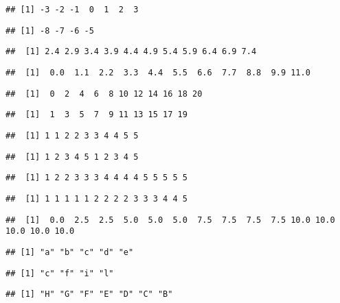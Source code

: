 \documentclass[
]{article}
\begin{document}
\begin{verbatim}
## [1] -3 -2 -1  0  1  2  3
\end{verbatim}

\begin{verbatim}
## [1] -8 -7 -6 -5
\end{verbatim}

\begin{verbatim}
##  [1] 2.4 2.9 3.4 3.9 4.4 4.9 5.4 5.9 6.4 6.9 7.4
\end{verbatim}

\begin{verbatim}
##  [1]  0.0  1.1  2.2  3.3  4.4  5.5  6.6  7.7  8.8  9.9 11.0
\end{verbatim}

\begin{verbatim}
##  [1]  0  2  4  6  8 10 12 14 16 18 20
\end{verbatim}

\begin{verbatim}
##  [1]  1  3  5  7  9 11 13 15 17 19
\end{verbatim}

\begin{verbatim}
##  [1] 1 1 2 2 3 3 4 4 5 5
\end{verbatim}

\begin{verbatim}
##  [1] 1 2 3 4 5 1 2 3 4 5
\end{verbatim}

\begin{verbatim}
##  [1] 1 2 2 3 3 3 4 4 4 4 5 5 5 5 5
\end{verbatim}

\begin{verbatim}
##  [1] 1 1 1 1 1 2 2 2 2 3 3 3 4 4 5
\end{verbatim}

\begin{verbatim}
##  [1]  0.0  2.5  2.5  5.0  5.0  5.0  7.5  7.5  7.5  7.5 10.0 10.0 10.0 10.0 10.0
\end{verbatim}

\begin{verbatim}
## [1] "a" "b" "c" "d" "e"
\end{verbatim}

\begin{verbatim}
## [1] "c" "f" "i" "l"
\end{verbatim}

\begin{verbatim}
## [1] "H" "G" "F" "E" "D" "C" "B"
\end{verbatim}
\end{document}
